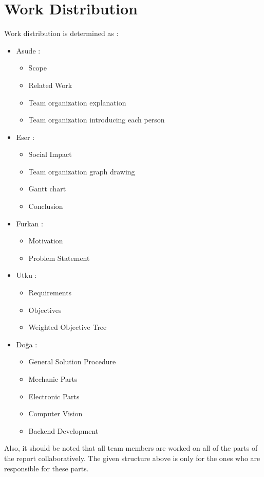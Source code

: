 \section{Work Distribution}
\label{sec:workDistribution}
Work distribution is determined as :
\begin{itemize}
    \item Asude :
    \begin{itemize}
        \item Scope
        \item Related Work
        \item Team organization explanation
        \item Team organization introducing each person
    \end{itemize}
    
    \item Eser :
    \begin{itemize}
        \item Social Impact
        \item Team organization graph drawing
        \item Gantt chart
        \item Conclusion
    \end{itemize}
    
    \item Furkan : 
    \begin{itemize}
        \item Motivation
        \item Problem Statement
    \end{itemize}

    \item Utku :
    \begin{itemize}
        \item Requirements
        \item Objectives
        \item Weighted Objective Tree
    \end{itemize}
    
    \item Doğa : 
    \begin{itemize}
        \item General Solution Procedure
        \item Mechanic Parts
        \item Electronic Parts
        \item Computer Vision
        \item Backend Development
    \end{itemize}
\end{itemize}

Also, it should be noted that all team members are worked on all of the parts of the report collaboratively. The given structure above is only for the ones who are responsible for these parts.

